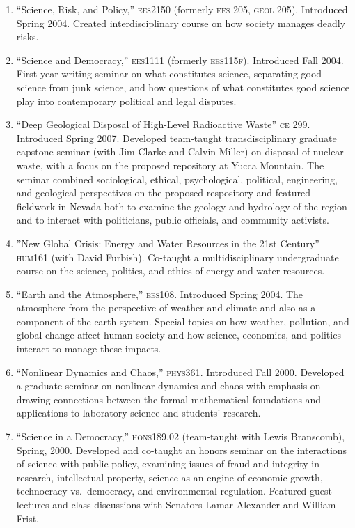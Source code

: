 \begin{enumerate}
\item ``Science, Risk, and Policy,'' \textsc{ees2150} (formerly \textsc{ees 205}, \textsc{geol 205}). Introduced Spring 2004. Created interdisciplinary course on how society manages deadly risks.
\item ``Science and Democracy,'' \textsc{ees1111} (formerly \textsc{ees115f}). Introduced Fall 2004.  First-year writing seminar on what constitutes science, separating good science from junk science, and how questions of what constitutes good science play into contemporary political and legal disputes.
\item ``Deep Geological Disposal of High-Level Radioactive Waste'' \textsc{ce 299}. Introduced Spring 2007. Developed team-taught transdisciplinary graduate capstone seminar (with Jim Clarke and Calvin Miller) on disposal of nuclear waste, with a focus on the proposed repository at Yucca Mountain. The seminar combined sociological, ethical, psychological, political, engineering, and geological perspectives on the proposed respository and featured fieldwork in Nevada both to examine the geology and hydrology of the region and to interact with politicians, public officials, and community activists.
\item ''New Global Crisis: Energy and Water Resources in the 21st Century'' \textsc{hum161} (with David Furbish). Co-taught a multidisciplinary undergraduate course on the science, politics, and ethics of energy and water resources.
\item ``Earth and the Atmosphere,'' \textsc{ees108}. Introduced Spring 2004. The atmosphere from the perspective of weather and climate and also as a component of the earth system. Special topics on how weather, pollution, and global change affect human society and how science, economics, and politics interact to manage these impacts.
\item ``Nonlinear Dynamics and Chaos,'' \textsc{phys361}. Introduced Fall 2000. Developed a graduate seminar on nonlinear dynamics and chaos with emphasis on drawing connections between the formal mathematical foundations and applications to laboratory science and students' research.
\item ``Science in a Democracy,'' \textsc{hons189.02} (team-taught with Lewis Branscomb), Spring, 2000. Developed and co-taught an honors seminar on the interactions of science with public policy, examining issues of fraud and integrity in research, intellectual property, science as an engine of economic growth, technocracy vs.\ democracy, and environmental regulation. Featured guest lectures and class discussions with Senators Lamar Alexander and William Frist.
\end{enumerate}